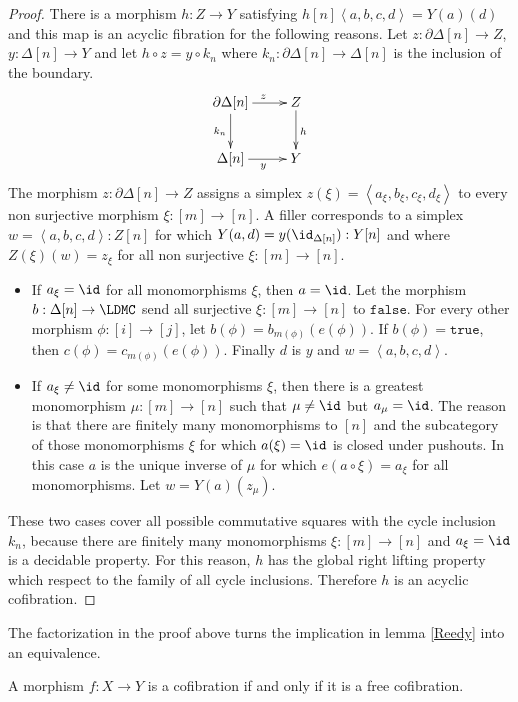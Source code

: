 \documentclass{tac}
\newcommand\of{:}
\newcommand\simplex\Delta
\newcommand\cycle{\partial\Delta}
\newcommand\tuplet[1]{\left\langle #1 \right\rangle}
\newcommand\true{\mathtt{true}}
\newcommand\false{\mathtt{false}}
\begin{document}
\begin{proof}
There is a morphism $h\of Z\to Y$ satisfying $h[n]\tuplet{a,b,c,d} = Y(a)(d)$ and this map is an acyclic fibration for the following reasons.
Let $z\of\cycle[n]\to Z$, $y\of\simplex[n]\to Y$ and let $h\circ z = y\circ k_n$ where $k_n\of\cycle[n]\to \simplex[n]$ is the inclusion of the boundary.
\[\xymatrix{
\cycle[n]\ar[d]_{k_n}\ar[r]^z & Z\ar[d]^h\\
\simplex[n]\ar[r]_{y} & Y
}\]
The morphism $z\of\cycle[n]\to Z$ assigns a simplex $z(\xi) = \tuplet{a_\xi,b_\xi,c_\xi,d_\xi}$ to every non surjective morphism $\xi\of [m]\to[n]$.
A filler corresponds to a simplex $w=\tuplet{a,b,c,d}\of Z[n]$ for which $Y(a,d) = y(\id_{\simplex[n]})\of Y[n]$ and where $Z(\xi)(w)=z_\xi$ for all non surjective $\xi\of [m]\to[n]$.
\begin{itemize}
\item If $a_\xi=\id$ for all monomorphisms $\xi$, then $a=\id$. Let the morphism $b\of \simplex[n]\to \LDMC$ send all surjective $\xi\of[m]\to[n]$ to $\false$. For every other morphism $\phi\of [i]\to [j]$, let $b(\phi) = b_{m(\phi)}(e(\phi))$. If $b(\phi)=\true$, then $c(\phi) = c_{m(\phi)}(e(\phi))$. Finally $d$ is $y$ and $w=\tuplet{a,b,c,d}$.
\item If $a_\xi\neq \id$ for some monomorphisms $\xi$, then there is a greatest monomorphism $\mu\of [m]\to[n]$ such that $\mu\neq \id$ but $a_\mu=\id$. The reason is that there are finitely many monomorphisms to $[n]$ and the subcategory of those monomorphisms $\xi$ for which $a(\xi)=\id$ is closed under pushouts. In this case $a$ is the unique inverse of $\mu$ for which $e(a\circ \xi) = a_\xi$ for all monomorphisms. Let $w = Y(a)(z_\mu)$.
\end{itemize}

These two cases cover all possible commutative squares with the cycle inclusion $k_n$, because there are finitely many monomorphisms $\xi\of [m]\to [n]$ and $a_\xi = \id$ is a decidable property. For this reason, $h$ has the global right lifting property which respect to the family of all cycle inclusions. Therefore $h$ is an acyclic cofibration.
\end{proof} %




The factorization in the proof above turns the implication in lemma \ref{Reedy} into an equivalence.

\begin{proposition} A morphism $f\of X\to Y$ is a cofibration if and only if it is a free cofibration. \label{cofibration characterization} \end{proposition}
\end{document}
